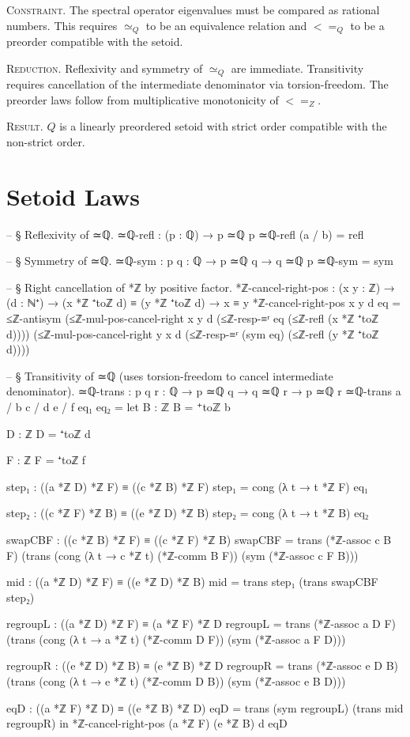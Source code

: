\documentclass[11pt,a4paper]{book}
\def\leq{<=}%
\def\mathbb#1{#1}%
\begin{document}
\textsc{Constraint.}
The spectral operator eigenvalues must be compared as rational numbers.
This requires $\simeq_{\mathbb{Q}}$ to be an equivalence relation and
$\leq_{\mathbb{Q}}$ to be a preorder compatible with the setoid.

\textsc{Reduction.}
Reflexivity and symmetry of $\simeq_{\mathbb{Q}}$ are immediate.
Transitivity requires cancellation of the intermediate denominator via
torsion-freedom. The preorder laws follow from multiplicative monotonicity of
$\leq_{\mathbb{Z}}$.

\textsc{Result.}
$\mathbb{Q}$ is a linearly preordered setoid with strict order compatible
with the non-strict order.

\section{Setoid Laws}

\begin{code}
-- § Reflexivity of ≃ℚ.
≃ℚ-refl : (p : ℚ) → p ≃ℚ p
≃ℚ-refl (a / b) = refl

-- § Symmetry of ≃ℚ.
≃ℚ-sym : {p q : ℚ} → p ≃ℚ q → q ≃ℚ p
≃ℚ-sym = sym

-- § Right cancellation of *ℤ by positive factor.
*ℤ-cancel-right-pos : (x y : ℤ) → (d : ℕ⁺) → (x *ℤ ⁺toℤ d) ≡ (y *ℤ ⁺toℤ d) → x ≡ y
*ℤ-cancel-right-pos x y d eq =
  ≤ℤ-antisym
    (≤ℤ-mul-pos-cancel-right x y d (≤ℤ-resp-≡ʳ eq (≤ℤ-refl (x *ℤ ⁺toℤ d))))
    (≤ℤ-mul-pos-cancel-right y x d (≤ℤ-resp-≡ʳ (sym eq) (≤ℤ-refl (y *ℤ ⁺toℤ d))))

-- § Transitivity of ≃ℚ (uses torsion-freedom to cancel intermediate denominator).
≃ℚ-trans : {p q r : ℚ} → p ≃ℚ q → q ≃ℚ r → p ≃ℚ r
≃ℚ-trans {a / b} {c / d} {e / f} eq₁ eq₂ =
  let
    B : ℤ
    B = ⁺toℤ b

    D : ℤ
    D = ⁺toℤ d

    F : ℤ
    F = ⁺toℤ f

    step₁ : ((a *ℤ D) *ℤ F) ≡ ((c *ℤ B) *ℤ F)
    step₁ = cong (λ t → t *ℤ F) eq₁

    step₂ : ((c *ℤ F) *ℤ B) ≡ ((e *ℤ D) *ℤ B)
    step₂ = cong (λ t → t *ℤ B) eq₂

    swapCBF : ((c *ℤ B) *ℤ F) ≡ ((c *ℤ F) *ℤ B)
    swapCBF =
      trans
        (*ℤ-assoc c B F)
        (trans
          (cong (λ t → c *ℤ t) (*ℤ-comm B F))
          (sym (*ℤ-assoc c F B)))

    mid : ((a *ℤ D) *ℤ F) ≡ ((e *ℤ D) *ℤ B)
    mid = trans step₁ (trans swapCBF step₂)

    regroupL : ((a *ℤ D) *ℤ F) ≡ (a *ℤ F) *ℤ D
    regroupL =
      trans
        (*ℤ-assoc a D F)
        (trans
          (cong (λ t → a *ℤ t) (*ℤ-comm D F))
          (sym (*ℤ-assoc a F D)))

    regroupR : ((e *ℤ D) *ℤ B) ≡ (e *ℤ B) *ℤ D
    regroupR =
      trans
        (*ℤ-assoc e D B)
        (trans
          (cong (λ t → e *ℤ t) (*ℤ-comm D B))
          (sym (*ℤ-assoc e B D)))

    eqD : ((a *ℤ F) *ℤ D) ≡ ((e *ℤ B) *ℤ D)
    eqD = trans (sym regroupL) (trans mid regroupR)
  in
  *ℤ-cancel-right-pos (a *ℤ F) (e *ℤ B) d eqD
\end{code}
\end{document}
